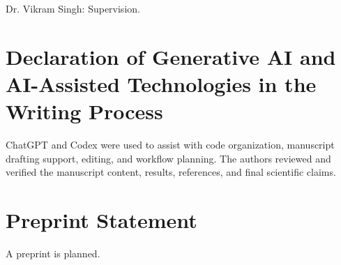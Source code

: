 Dr. Vikram Singh: Supervision.

\section*{Declaration of Generative AI and AI-Assisted Technologies in the Writing Process}
ChatGPT and Codex were used to assist with code organization, manuscript drafting support, editing, and workflow planning. The authors reviewed and verified the manuscript content, results, references, and final scientific claims.

\section*{Preprint Statement}
A preprint is planned.
